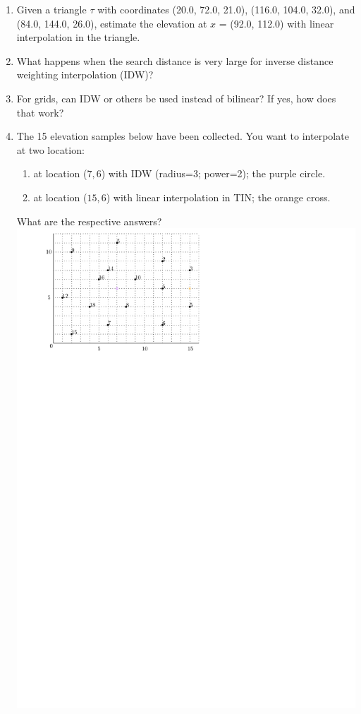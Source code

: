 \begin{enumerate}
  \item Given a triangle $\tau$ with coordinates (20.0, 72.0, 21.0), (116.0, 104.0, 32.0), and (84.0, 144.0, 26.0), estimate the elevation at $x$ = (92.0, 112.0) with linear interpolation in the triangle.
  \item What happens when the search distance is very large for inverse distance weighting interpolation (IDW)?
  \item For grids, can IDW or others be used instead of bilinear? If yes, how does that work?
  \item The 15 elevation samples below have been collected. You want to interpolate at two location:
  \begin{enumerate}
    \item at location ($7,6$) with IDW (radius=3; power=2); the purple circle.
    \item at location ($15,6$) with linear interpolation in TIN; the orange cross.
  \end{enumerate} 
  What are the respective answers?
  \\
  \includegraphics[width=0.75\linewidth]{figs/interpol}
\end{enumerate}
